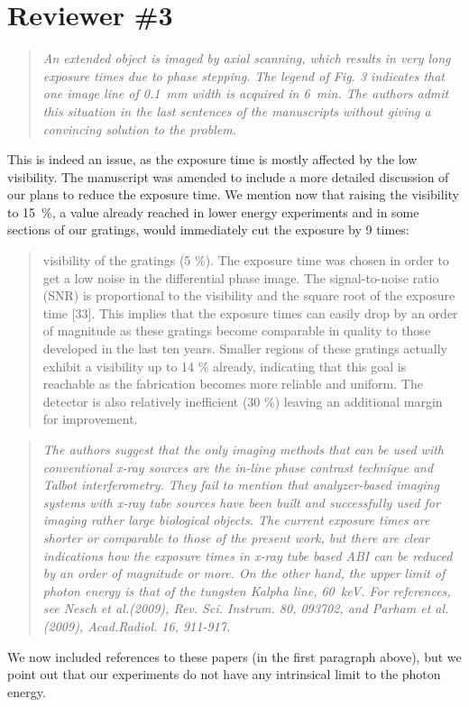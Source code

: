 \documentclass[a4paper,english]{scrartcl}
\newenvironment{reviewerquote}{\begin{quote}\itshape}{\end{quote}}
\begin{document}
\section*{Reviewer \#3}

\begin{reviewerquote}
    An extended object is imaged by axial scanning, which results in very
    long exposure times due to phase stepping.  The legend of Fig. 3
    indicates that one image line of \SI{0.1}{\milli\metre} width is
    acquired in \SI{6}{\minute}.  The authors admit this situation in the last sentences of the manuscripts without giving a convincing solution to the problem.
\end{reviewerquote}
This is indeed an issue, as the exposure time is mostly affected by the low visibility. The manuscript
was amended to include a more detailed discussion of our plans to reduce
the exposure time. We mention now that raising the visibility to
\SI{15}{\percent}, a value already reached in lower energy experiments and
in some sections of our gratings,
would immediately cut the exposure by \num{9} times:
\begin{quote}
visibility of the gratings (5 \%). The exposure time was chosen in order to get a low noise in
the differential phase image. The signal-to-noise ratio (SNR) is proportional to the visibility
and the square root of the exposure time [33]. This implies that the exposure times can
easily drop by an order of magnitude as these gratings become comparable in quality to
those developed in the last ten years. Smaller regions of these gratings actually exhibit a
visibility up to 14 \% already, indicating that this goal is reachable as the fabrication becomes
more reliable and uniform. The detector is also relatively inefficient (30
\%) leaving an
additional margin for improvement.
\end{quote}
\begin{reviewerquote}
    The authors suggest that the only imaging methods that can be used with
    conventional x-ray sources are the in-line phase contrast technique and
    Talbot interferometry. They fail to mention that analyzer-based imaging
    systems with x-ray tube sources have been built and successfully used
    for imaging rather large biological objects. The current exposure times
    are shorter or comparable to those of the present work, but there are
    clear indications how the exposure times in x-ray tube based ABI can be
    reduced by an order of magnitude or more. On the other hand, the upper
    limit of photon energy is that of the tungsten Kalpha line,
    \SI{60}{\kilo\eV}. For references, see Nesch et al.(2009), Rev. Sci.
    Instrum. 80, 093702, and Parham et al.(2009), Acad.Radiol. 16, 911-917.
\end{reviewerquote}
We now included references to these papers (in the first paragraph above), but we point out that our
experiments do not have any intrinsical limit to the photon energy.
\end{document}
